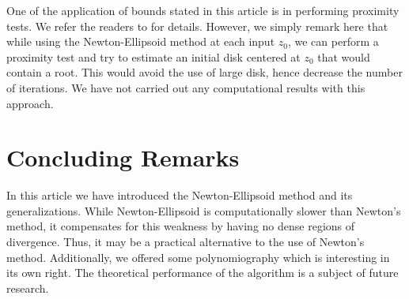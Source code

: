 \documentclass{article}
\begin{document}
One of the application of bounds stated in this article is in performing proximity tests. We refer the readers to \cite{kalbook} for details. However, we simply remark here that while using the Newton-Ellipsoid method at each input $z_0$, we can perform a proximity test and try to estimate an initial disk centered at $z_0$ that would contain a root.  This would avoid the use of large disk, hence decrease the number of iterations. We have not carried out any computational results with this approach.

\section{Concluding Remarks}
In this article we have introduced the Newton-Ellipsoid method and its generalizations.  While Newton-Ellipsoid is computationally slower than Newton's method, it compensates for this weakness by having no dense regions of divergence. Thus, it may be a practical alternative to the use of Newton's method.  Additionally, we offered some polynomiography which is interesting in its own right. The theoretical performance of the algorithm is a subject of future research.
\end{document}
